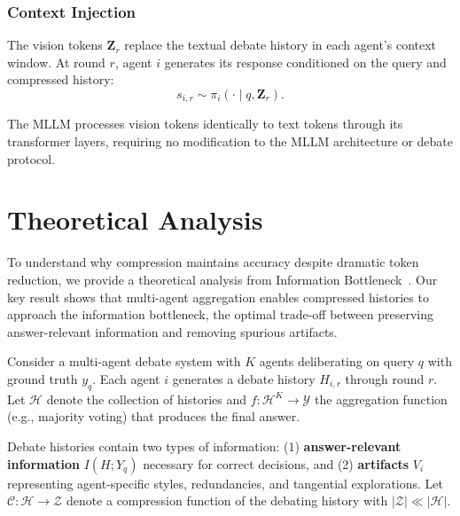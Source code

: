 \documentclass{article}
\theoremstyle{plain}
\theoremstyle{definition}
\theoremstyle{remark}
\begin{document}
\subsubsection{Context Injection}
\label{subsubsec:context_injection}

The vision tokens $\mathbf{Z}_r$ replace the textual debate history in each agent's 
context window. At round $r$, agent $i$ generates its response conditioned on the 
query and compressed history:
\begin{equation}
\label{eq:visual_generation}
    s_{i,r} \sim \pi_i(\cdot \mid q, \mathbf{Z}_r).
\end{equation}

The MLLM processes vision tokens identically to text tokens through its transformer 
layers, requiring no modification to the MLLM architecture or debate protocol. 




\section{Theoretical Analysis}
\label{sec: theoretical_analysis}

To understand why compression maintains accuracy despite dramatic token reduction, we provide a theoretical analysis from Information Bottleneck~\cite{kawaguchi2023does}. Our key result shows that multi-agent aggregation enables compressed histories to approach the information bottleneck, the optimal trade-off between preserving answer-relevant information and removing spurious artifacts.

Consider a multi-agent debate system with $K$ agents deliberating on query $q$ with ground truth $y_q$. Each agent $i$ generates a debate history $H_{i,r}$ through round $r$. Let $\mathcal{H}$ denote the collection of histories and $f : \mathcal{H}^K \to \mathcal{Y}$ the aggregation function (e.g., majority voting) that produces the final answer.

Debate histories contain two types of information: (1) \textbf{answer-relevant information} $I(H; Y_q)$ necessary for correct decisions, and (2) \textbf{artifacts} $V_i$ representing agent-specific styles, redundancies, and tangential explorations. 
Let $\mathcal{C} : \mathcal{H} \to \mathcal{Z}$ denote a compression function of the debating history with $|\mathcal{Z}| \ll |\mathcal{H}|$.
\end{document}
